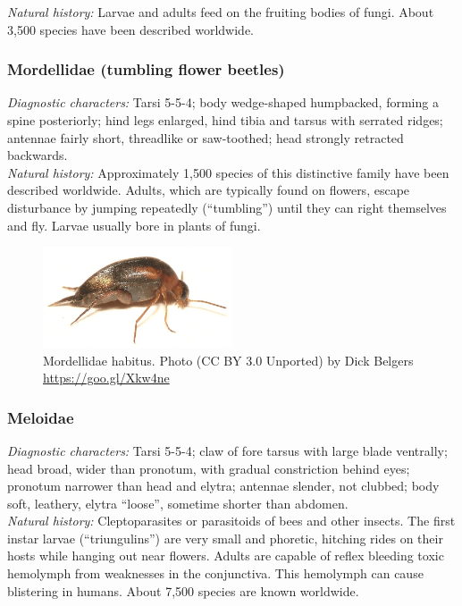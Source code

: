 \documentclass[letterpaper, 11pt]{article}
\begin{document}
\noindent{}\textit{Natural history:} Larvae and adults feed on the fruiting bodies of fungi. About 3,500 species have been described worldwide.

\subsubsection{Mordellidae (tumbling flower beetles)}
\noindent{}\textit{Diagnostic characters:} Tarsi 5-5-4; body wedge-shaped humpbacked, forming a spine posteriorly; hind legs enlarged, hind tibia and tarsus with serrated ridges; antennae fairly short, threadlike or saw-toothed; head strongly retracted backwards.\\

\noindent{}\textit{Natural history:} Approximately 1,500 species of this distinctive family have been described worldwide. Adults, which are typically found on flowers, escape disturbance by jumping repeatedly (``tumbling'') until they can right themselves and fly. Larvae usually bore in plants of fungi.

\begin{figure}[ht!]
  \centering
    \includegraphics[width=0.5\textwidth]{MordellidHabitus}
  \caption{Mordellidae habitus. Photo (CC BY 3.0 Unported) by Dick Belgers \url{https://goo.gl/Xkw4ne}}
  \label{fig:mordellid}
\end{figure}

\subsubsection{Meloidae}
\noindent{}\textit{Diagnostic characters:} Tarsi 5-5-4; claw of fore tarsus with large blade ventrally; head broad, wider than pronotum, with gradual constriction behind eyes; pronotum narrower than head and elytra; antennae slender, not clubbed; body soft, leathery, elytra ``loose'', sometime shorter than abdomen.\\

\noindent{}\textit{Natural history:} Cleptoparasites or parasitoids of bees and other insects. The first instar larvae (``triungulins'') are very small and phoretic, hitching rides on their hosts while hanging out near flowers. Adults are capable of reflex bleeding toxic hemolymph from weaknesses in the conjunctiva. This hemolymph can cause blistering in humans. About 7,500 species are known worldwide.\\
\end{document}
